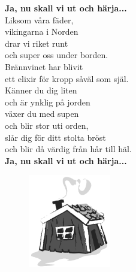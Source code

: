 \documentclass[a6paper,10pt]{article}
\begin{document}
\begin{lyrics}
\textbf{Ja, nu skall vi ut och härja...} 
\vspace{5pt}\\
Liksom våra fäder, \\
vikingarna i Norden\\
drar vi riket runt \\och super oss under borden.\\
Brännvinet har blivit \\ett elixir för kropp såväl som själ.
\vspace{5pt}\\
Känner du dig liten \\och är ynklig på jorden\\
växer du med supen \\och blir stor uti orden,\\
slår dig för ditt stolta bröst \\och blir då värdig från hår till häl. 
\vspace{5pt}\\
\textbf{Ja, nu skall vi ut och härja...}
\end{lyrics}
\vspace{-30pt}
\begin{figure}[!h]
\includegraphics[width=0.32\textwidth]{rodstuga.png}
\end{figure}
\end{document}
